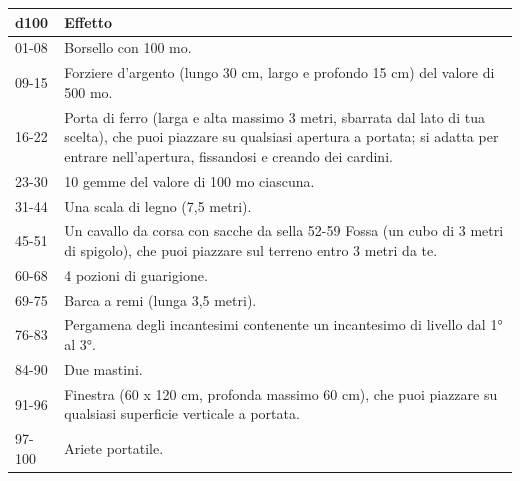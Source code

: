 \medskip
\begin{tabularx}{0.95\textwidth}{lX}
\textbf{d100} & \textbf{Effetto}\\
\hline
01-08 &Borsello con 100 mo.\\
09-15& Forziere d'argento (lungo 30 cm, largo e profondo 15 cm) del valore di 500 mo.\\
16-22& Porta di ferro (larga e alta massimo 3 metri, sbarrata dal lato di tua scelta), che puoi piazzare su qualsiasi apertura a portata; si adatta per entrare nell'apertura, fissandosi e creando dei cardini.\\
23-30 &10 gemme del valore di 100 mo ciascuna.\\
31-44 &Una scala di legno (7,5 metri).\\
45-51 &Un cavallo da corsa con sacche da sella 52-59 Fossa (un cubo di 3 metri di spigolo), che puoi piazzare sul terreno entro 3 metri da te.\\
60-68 &4 pozioni di guarigione. \\
69-75 &Barca a remi (lunga 3,5 metri).\\
76-83& Pergamena degli incantesimi contenente un incantesimo di livello dal 1° al 3°.\\
84-90& Due mastini.\\
91-96 &Finestra (60 x 120 cm, profonda massimo 60 cm), che puoi piazzare su qualsiasi superficie verticale a portata.\\
97-100 &Ariete portatile.\\
\end{tabularx}

